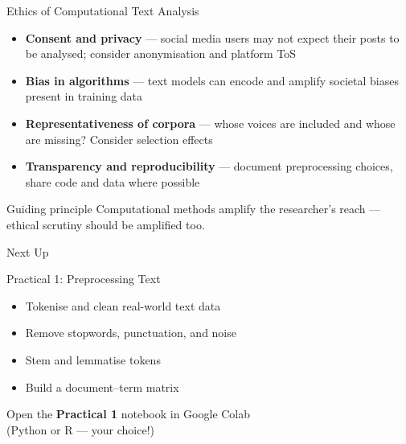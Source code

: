 \documentclass[aspectratio=169]{beamer}
\begin{document}
\begin{frame}{Ethics of Computational Text Analysis}
    \begin{itemize}
        \item {} \textbf{Consent and privacy} --- social media users may not expect their posts to be analysed; consider anonymisation and platform ToS
        \item {} \textbf{Bias in algorithms} --- text models can encode and amplify societal biases present in training data
        \item {} \textbf{Representativeness of corpora} --- whose voices are included and whose are missing? Consider selection effects
        \item {} \textbf{Transparency and reproducibility} --- document preprocessing choices, share code and data where possible
    \end{itemize}

    \vspace{0.3cm}
    \begin{exampleblock}{Guiding principle}
        Computational methods amplify the researcher's reach --- ethical scrutiny should be amplified too.
    \end{exampleblock}
\end{frame}

\begin{frame}{Next Up}
    \begin{center}
        {\Large \alert{Practical 1: Preprocessing Text}}\\[0.5cm]
        \begin{itemize}
            \item Tokenise and clean real-world text data
            \item Remove stopwords, punctuation, and noise
            \item Stem and lemmatise tokens
            \item Build a document--term matrix
        \end{itemize}
        \vspace{0.5cm}
        {\normalsize Open the \textbf{Practical 1} notebook in Google Colab\\(Python or R --- your choice!)}
    \end{center}
\end{frame}
\end{document}
